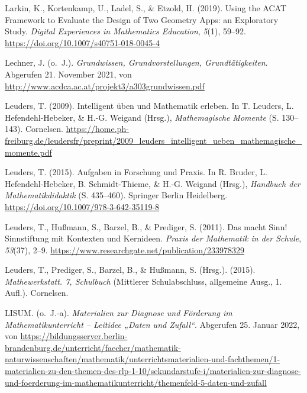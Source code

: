 \documentclass[
  ngerman,
]{scrbook}
\newlength{\cslhangindent}
\newlength{\cslentryspacingunit} %
\newenvironment{CSLReferences}[2] %
 {%
  \setlength{\parindent}{0pt}
  \ifodd #1
  \let\oldpar\par
  \def\par{\hangindent=\cslhangindent\oldpar}
  \fi
  \setlength{\parskip}{#2\cslentryspacingunit}
 }%
 {}
\theoremstyle{definition}
\theoremstyle{definition}
\theoremstyle{definition}
\theoremstyle{definition}
\theoremstyle{remark}
\begin{document}
\begin{CSLReferences}{1}{0}
\leavevmode{}%
Larkin, K., Kortenkamp, U., Ladel, S., \& Etzold, H. (2019). Using the {ACAT} {Framework} to {Evaluate} the {Design} of {Two} {Geometry} {Apps}: an {Exploratory} {Study}. \emph{Digital Experiences in Mathematics Education}, \emph{5}(1), 59--92. \url{https://doi.org/10.1007/s40751-018-0045-4}

\leavevmode{}%
Lechner, J. (o.~J.). \emph{Grundwissen, {Grundvorstellungen}, {Grundtätigkeiten}}. Abgerufen 21. November 2021, von \url{http://www.acdca.ac.at/projekt3/a303grundwissen.pdf}

\leavevmode{}%
Leuders, T. (2009). Intelligent üben und {Mathematik} erleben. In T. Leuders, L. Hefendehl-Hebeker, \& H.-G. Weigand (Hrsg.), \emph{Mathemagische {Momente}} (S. 130--143). Cornelsen. \url{https://home.ph-freiburg.de/leudersfr/preprint/2009_leuders_intelligent_ueben_mathemagische_momente.pdf}

\leavevmode{}%
Leuders, T. (2015). Aufgaben in {Forschung} und {Praxis}. In R. Bruder, L. Hefendehl-Hebeker, B. Schmidt-Thieme, \& H.-G. Weigand (Hrsg.), \emph{Handbuch der {Mathematikdidaktik}} (S. 435--460). Springer Berlin Heidelberg. \url{https://doi.org/10.1007/978-3-642-35119-8}

\leavevmode{}%
Leuders, T., Hußmann, S., Barzel, B., \& Prediger, S. (2011). Das macht {Sinn}! {Sinnstiftung} mit {Kontexten} und {Kernideen}. \emph{Praxis der Mathematik in der Schule}, \emph{53}(37), 2--9. \url{https://www.researchgate.net/publication/233978329}

\leavevmode{}%
Leuders, T., Prediger, S., Barzel, B., \& Hußmann, S. (Hrsg.). (2015). \emph{Mathewerkstatt. 7, {Schulbuch}} (Mittlerer Schulabschluss, allgemeine Ausg., 1. Aufl.). Cornelsen.

\leavevmode{}%
LISUM. (o.~J.-a). \emph{Materialien zur {Diagnose} und {Förderung} im {Mathematikunterricht} -- {Leitidee} „{Daten} und {Zufall}``}. Abgerufen 25. Januar 2022, von \url{https://bildungsserver.berlin-brandenburg.de/unterricht/faecher/mathematik-naturwissenschaften/mathematik/unterrichtsmaterialien-und-fachthemen/1-materialien-zu-den-themen-des-rlp-1-10/sekundarstufe-i/materialien-zur-diagnose-und-foerderung-im-mathematikunterricht/themenfeld-5-daten-und-zufall}


\end{CSLReferences}
\end{document}
